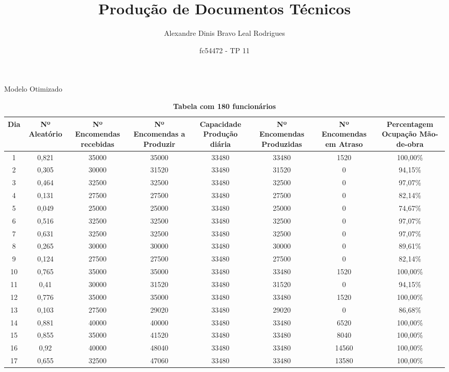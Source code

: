 \documentclass [11pt, a4paper]{beamer}
\author{Alexandre Dinis Bravo Leal Rodrigues}
\title{Produção de Documentos Técnicos}
\date{fc54472 - TP 11}
\begin{document}
\maketitle
\begin{frame}{Modelo Otimizado}
\begin{table} [h]
\begin{center}
\caption{\bf Tabela com 180 funcionários}
\begin{adjustbox}{max width=\textwidth,max totalheight=\textheight,keepaspectratio}
\begin{tabular} {|c|c|c|c|c|c|c|c|}
\hline 
Dia	& Nº Aleatório & Nº Encomendas recebidas &	Nº Encomendas a Produzir &	Capacidade Produção diária &	Nº Encomendas Produzidas &	Nº Encomendas em Atraso &	Percentagem Ocupação Mão-de-obra \\ 
\hline 
1 &	0,821 &	35000 &	35000 &	33480 &	33480 &	1520 &	100,00\%\\ \hline 
2 &	0,305 &	30000 &	31520 &	33480 &	31520 &	0 &	94,15\%\\ \hline
3 &	0,464 &	32500 &	32500 &	33480 &	32500 &	0 &	97,07\%\\ \hline
4 &	0,131 &	27500 &	27500 &	33480 &	27500 &	0 &	82,14\%\\ \hline
5 &	0,049 &	25000 &	25000 &	33480 &	25000 &	0 &	74,67\%\\ \hline
6 &	0,516 &	32500 &	32500 &	33480 &	32500 &	0 &	97,07\%\\ \hline
7 &	0,631 &	32500 &	32500 &	33480 &	32500 &	0 &	97,07\%\\ \hline
8 &	0,265 &	30000 &	30000 &	33480 &	30000 &	0 &	89,61\%\\ \hline
9 &	0,124 &	27500 &	27500 &	33480 &	27500 &	0 &	82,14\%\\ \hline
10 &	0,765 &	35000 &	35000 &	33480 &	33480 &	1520 &	100,00\%\\ \hline
11 &	0,41 &	30000 &	31520 &	33480 &	31520 &	0 &	94,15\%\\ \hline
12 &	0,776 &	35000 &	35000 &	33480 &	33480 &	1520 &	100,00\%\\ \hline
13 &	0,103 &	27500 &	29020 &	33480 &	29020 &	0 &	86,68\%\\ \hline
14 &	0,881 &	40000 &	40000 &	33480 &	33480 &	6520 &	100,00\%\\ \hline
15 &	0,855 &	35000 &	41520 &	33480 &	33480 &	8040 &	100,00\%\\ \hline
16 &	0,92 &	40000 &	48040 &	33480 &	33480 &	14560 &	100,00\%\\ \hline
17 &	0,655 &	32500 &	47060 &	33480 &	33480 &	13580 &	100,00\%\\ \hline

\end{tabular}
\end{adjustbox}
\end{center}
\end{table}
\end{frame}
\end{document}
